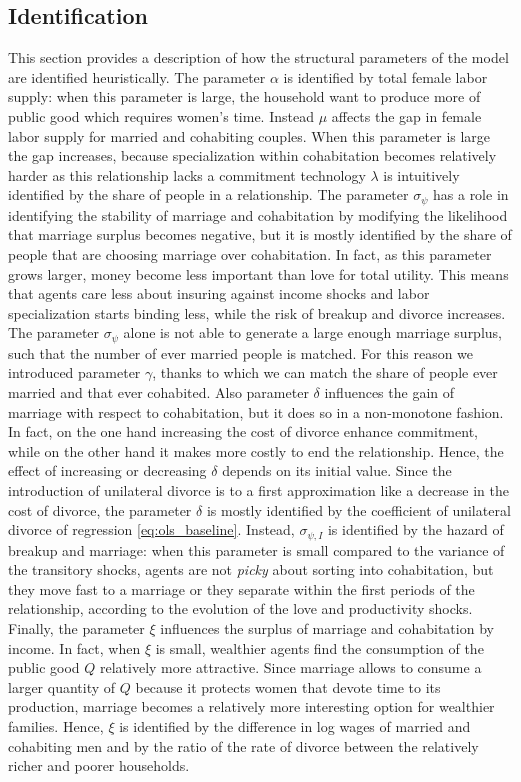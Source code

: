 \documentclass[12pt]{article}
\numberwithin{table}{section}
\begin{document}
\subsection{Identification}
This section provides a description of how the structural parameters of the model are identified  heuristically. The parameter $\alpha$ is identified by total female labor supply: when this parameter is large, the household want to produce more of public good which requires women's time. Instead $\mu$ affects the gap in female labor supply for married and cohabiting couples. When this parameter is large the gap increases, because specialization within cohabitation becomes relatively harder as this relationship lacks a commitment technology $\lambda$ is intuitively identified by the share of people in a relationship.  The parameter $\sigma_{\psi}$ has a role in identifying the stability of marriage and cohabitation by modifying the likelihood that marriage surplus becomes negative, but it is mostly identified by the share of people that are choosing marriage over cohabitation. In fact, as this parameter
grows larger, money become less important than love for total utility. This means that
agents care less about insuring against income shocks and labor specialization starts
binding less, while the risk of breakup and divorce increases. The parameter $\sigma_{\psi}$ alone is not able to generate a large enough marriage surplus, such that the number of ever married people is matched. For this reason we introduced parameter $\gamma$, thanks to which we can match the share of people ever married and that ever cohabited. Also parameter $\delta$ influences the gain of marriage with respect to cohabitation, but it does so in a non-monotone fashion. In fact, on the one hand increasing the cost of divorce enhance commitment, while on the other hand it makes more costly to end the relationship. Hence, the effect of increasing or decreasing $\delta$ depends on its initial value. Since the introduction of unilateral divorce is to a first approximation like a decrease in the cost of divorce, the parameter $\delta$ is mostly identified by the coefficient of unilateral divorce of regression \ref{eq:ols_baseline}. Instead, $\sigma_{\psi,I}$ is identified by the hazard of breakup and marriage: when this parameter is small compared to the variance of the transitory shocks, agents are not \textit{picky} about sorting into cohabitation, but they move fast to a marriage or they separate within the first periods of the relationship, according to the evolution of the love and productivity shocks. Finally, the parameter $\xi$ influences the surplus of marriage and cohabitation by income. In fact, when $\xi$ is small, wealthier agents find the consumption of the public good $Q$ relatively more attractive. Since marriage allows to consume a larger quantity of $Q$ because it protects women that devote time to its production, marriage becomes a relatively more interesting option for wealthier families. Hence, $\xi$ is identified by the difference in log wages of married and cohabiting men and by the ratio of the rate of divorce between the relatively richer and poorer households.
\end{document}
